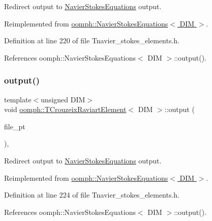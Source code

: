 Redirect output to \hyperlink{classoomph_1_1NavierStokesEquations}{Navier\+Stokes\+Equations} output. 



Reimplemented from \hyperlink{classoomph_1_1NavierStokesEquations_a2bc96a264dad4175d1aca7946db5f303}{oomph\+::\+Navier\+Stokes\+Equations$<$ D\+I\+M $>$}.



Definition at line 220 of file Tnavier\+\_\+stokes\+\_\+elements.\+h.



References oomph\+::\+Navier\+Stokes\+Equations$<$ D\+I\+M $>$\+::output().

\mbox{\label{classoomph_1_1TCrouzeixRaviartElement_acfd994f524621438f12661ee012a126a}} 
\subsubsection{\texorpdfstring{output()}{output()}\hspace{0.1cm}{\footnotesize\ttfamily [3/4]}}
{\footnotesize\ttfamily template$<$unsigned D\+IM$>$ \\
void \hyperlink{classoomph_1_1TCrouzeixRaviartElement}{oomph\+::\+T\+Crouzeix\+Raviart\+Element}$<$ D\+IM $>$\+::output (\begin{DoxyParamCaption}\item[{F\+I\+LE $\ast$}]{file\+\_\+pt }\end{DoxyParamCaption})\hspace{0.3cm}{\ttfamily [inline]}, {\ttfamily [virtual]}}



Redirect output to \hyperlink{classoomph_1_1NavierStokesEquations}{Navier\+Stokes\+Equations} output. 



Reimplemented from \hyperlink{classoomph_1_1NavierStokesEquations_acb921a406e5825d9b17ed41c40317e4a}{oomph\+::\+Navier\+Stokes\+Equations$<$ D\+I\+M $>$}.



Definition at line 224 of file Tnavier\+\_\+stokes\+\_\+elements.\+h.



References oomph\+::\+Navier\+Stokes\+Equations$<$ D\+I\+M $>$\+::output().

